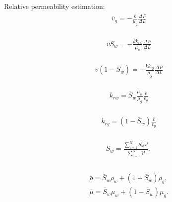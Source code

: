 \documentclass[a4paper,12pt]{extreport}
\begin{document}
Relative permeability estimation:
 \begin{eqnarray}
\label{eq:gas_velocity}
\begin{gathered}
\bar{v}_{g} = -\frac{k}{\mu_g} \frac{\Delta P}{\Delta L}
\end{gathered}
\end{eqnarray}

 \begin{eqnarray}
\label{eq:water_velocity}
\begin{gathered}
\bar{v}\bar{S}_w = -\frac{k k_{rw}}{\mu_w} \frac{\Delta P}{\Delta L}
\end{gathered}
\end{eqnarray}

 \begin{eqnarray}
\label{eq:gas_velocity}
\begin{gathered}
\bar{v} \left(1-\bar{S}_w\right) = -\frac{k k_{rg}}{\mu_g} \frac{\Delta P}{\Delta L}
\end{gathered}
\end{eqnarray}

 \begin{eqnarray}
\label{eq:water_rel}
\begin{gathered}
k_{rw}=\bar{S}_w\frac{\mu_w}{\mu_g}\frac{\bar{v}}{v_g}
\end{gathered}
\end{eqnarray}

 \begin{eqnarray}
\label{eq:water_rel}
\begin{gathered}
k_{rg}=\left(1-\bar{S}_w\right)\frac{\bar{v}}{v_g}
\end{gathered}
\end{eqnarray}

\begin{eqnarray}
\label{eq:sat_av}
\begin{gathered}
\bar{S}_w = \frac{\sum_{i=1}^N S_{w}^i V^i}{\sum_{i=1}^N V^i}, \\
\end{gathered}
\end{eqnarray}

\begin{eqnarray}
\label{eq:twophase_dens_visc_model}
\begin{gathered}
\bar{\rho} = \bar{S}_{w} \rho_w+ \left(1-\bar{S}_w\right) \rho_g, \\
\bar{\mu} = \bar{S}_{w} \mu_w+ \left(1-\bar{S}_w\right) \mu_g. \\
\end{gathered}
\end{eqnarray}
\end{document}
